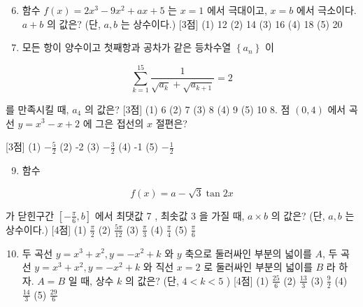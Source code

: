 \documentclass[10pt]{article}
\begin{document}
\begin{enumerate}
  \setcounter{enumi}{5}
  \item 함수 $f(x)=2 x^{3}-9 x^{2}+a x+5$ 는 $x=1$ 에서 극대이고, $x=b$ 에서 극소이다. $a+b$ 의 값은? (단, $a, b$ 는 상수이다.) [3점]
(1) 12
(2) 14
(3) 16
(4) 18
(5) 20

  \item 모든 항이 양수이고 첫째항과 공차가 같은 등차수열 $\left\{a_{n}\right\}$ 이

\end{enumerate}

$$
\sum_{k=1}^{15} \frac{1}{\sqrt{a_{k}}+\sqrt{a_{k+1}}}=2
$$

를 만족시킬 때, $a_{4}$ 의 값은? [3점]
(1) 6
(2) 7
(3) 8
(4) 9
(5) 10 8. 점 $(0,4)$ 에서 곡선 $y=x^{3}-x+2$ 에 그은 접선의 $x$ 절편은?

[3점]
(1) $-\frac{5}{2}$
(2) -2
(3) $-\frac{3}{2}$
(4) -1
(5) $-\frac{1}{2}$

\begin{enumerate}
  \setcounter{enumi}{8}
  \item 함수
\end{enumerate}

$$
f(x)=a-\sqrt{3} \tan 2 x
$$

가 닫힌구간 $\left[-\frac{\pi}{6}, b\right]$ 에서 최댓값 7 , 최솟값 3 을 가질 때, $a \times b$ 의 값은? (단, $a, b$ 는 상수이다.) [4점]
(1) $\frac{\pi}{2}$
(2) $\frac{5 \pi}{12}$
(3) $\frac{\pi}{3}$
(4) $\frac{\pi}{4}$
(5) $\frac{\pi}{6}$

\begin{enumerate}
  \setcounter{enumi}{9}
  \item 두 곡선 $y=x^{3}+x^{2}, y=-x^{2}+k$ 와 $y$ 축으로 둘러싸인 부분의 넓이를 $A$, 두 곡선 $y=x^{3}+x^{2}, y=-x^{2}+k$ 와 직선 $x=2$ 로 둘러싸인 부분의 넓이를 $B$ 라 하자. $A=B$ 일 때, 상수 $k$ 의 값은? (단, $4<k<5$ ) [4점]
(1) $\frac{25}{6}$
(2) $\frac{13}{3}$
(3) $\frac{9}{2}$
(4) $\frac{14}{3}$
(5) $\frac{29}{6}$
\end{enumerate}
\end{document}
